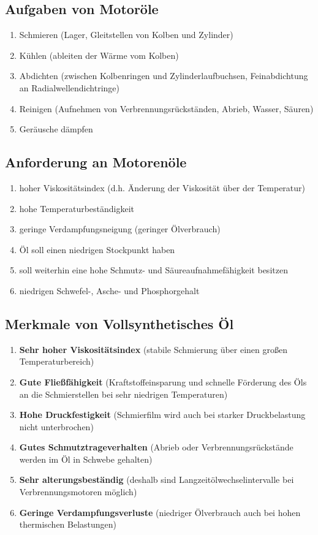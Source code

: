 \subsection{Aufgaben von Motoröle}\label{aufgaben-von-motoroele}

\begin{enumerate}
\item
  Schmieren (Lager, Gleitstellen von Kolben und Zylinder)
\item
  Kühlen (ableiten der Wärme vom Kolben)
\item
  Abdichten (zwischen Kolbenringen und Zylinderlaufbuchsen,
  Feinabdichtung an Radialwellendichtringe)
\item
  Reinigen (Aufnehmen von Verbrennungsrückständen, Abrieb, Wasser,
  Säuren)
\item
  Geräusche dämpfen
\end{enumerate}

\subsection{Anforderung an
Motorenöle}\label{anforderung-an-motorenoele}

\begin{enumerate}
\item
  hoher Viskositätsindex (d.h. Änderung der Viskosität über der
  Temperatur)
\item
  hohe Temperaturbeständigkeit
\item
  geringe Verdampfungsneigung (geringer Ölverbrauch)
\item
  Öl soll einen niedrigen Stockpunkt haben
\item
  soll weiterhin eine hohe Schmutz- und Säureaufnahmefähigkeit besitzen
\item
  niedrigen Schwefel-, Asche- und Phosphorgehalt
\end{enumerate}

\subsection{Merkmale von Vollsynthetisches
Öl}\label{merkmale-von-vollsynthetisches-oel}

\begin{enumerate}
\item
  \textbf{Sehr hoher Viskositätsindex} (stabile Schmierung über einen
  großen Temperaturbereich)
\item
  \textbf{Gute Fließfähigkeit} (Kraftstoffeinsparung und schnelle
  Förderung des Öls an die Schmierstellen bei sehr niedrigen
  Temperaturen)
\item
  \textbf{Hohe Druckfestigkeit} (Schmierfilm wird auch bei starker
  Druckbelastung nicht unterbrochen)
\item
  \textbf{Gutes Schmutztrageverhalten} (Abrieb oder
  Verbrennungsrückstände werden im Öl in Schwebe gehalten)
\item
  \textbf{Sehr alterungsbeständig} (deshalb sind
  Langzeitölwechselintervalle bei Verbrennungsmotoren möglich)
\item
  \textbf{Geringe Verdampfungsverluste} (niedriger Ölverbrauch auch bei
  hohen thermischen Belastungen)
\end{enumerate}

